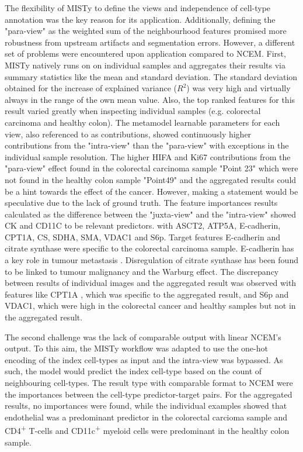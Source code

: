 The flexibility of MISTy to define the views and independence of cell-type annotation was the key reason for its application. Additionally, defining the "para-view" as the weighted sum of the neighbourhood features promised more robustness from upstream artifacts and segmentation errors. However, a different set of problems were encountered upon application compared to NCEM. First, MISTy natively runs on on individual samples and aggregates their results via summary statistics like the mean and standard deviation. The standard deviation obtained for the increase of explained variance ($R^2$) was very high and virtually always in the range of the own mean value. Also, the top ranked features for this result varied greatly when inspecting individual samples (e.g. colorectal carcinoma and healthy colon). The metamodel learnable parameters for each view, also referenced to as contributions, showed continuously higher contributions from the "intra-view" than the "para-view" with exceptions in the individual sample resolution. The higher HIFA and Ki67 contributions from the "para-view" effect found in the colorectal carcinoma sample "Point 23" which were not found in the healthy colon sample "Point49" and the aggregated results could be a hint towards the effect of the cancer. However, making a statement would be speculative due to the lack of ground truth. The feature importances results calculated as the difference between the "juxta-view" and the "intra-view" showed CK and CD11C to be relevant predictors.  with ASCT2, ATP5A, E-cadherin, CPT1A, CS, SDHA, SMA, VDAC1 and S6p. Target features E-cadherin and citrate synthase were specific to the colorectal carcinoma sample. E-cadherin has a key role in tumour metastasis \cite{Beavon-2000}. Disregulation of citrate synthase has been found to be linked to tumour malignancy and the Warburg effect\cite{Lin-2012}. The discrepancy between results of individual images and the aggregated result was observed with features like CPT1A , which was specific to the aggregated result, and S6p and VDAC1, which were high in the colorectal cancer and healthy samples but not in the aggregated result.

The second challenge was the lack of comparable output with linear NCEM's output. To this aim, the MISTy workflow was adapted to use the one-hot encoding of the index cell-types as input and the intra-view was bypassed. As such, the model would predict the index cell-type based on the count of neighbouring cell-types. The result type with comparable format to NCEM were the importances between the cell-type predictor-target pairs. For the aggregated results, no importances were found, while the individual examples showed that endothelial was a predominant predictor in the colorectal carcioma sample and CD4\textsuperscript{+} T-cells and CD11c\textsuperscript{+} myeloid cells were predominant in the healthy colon sample.

